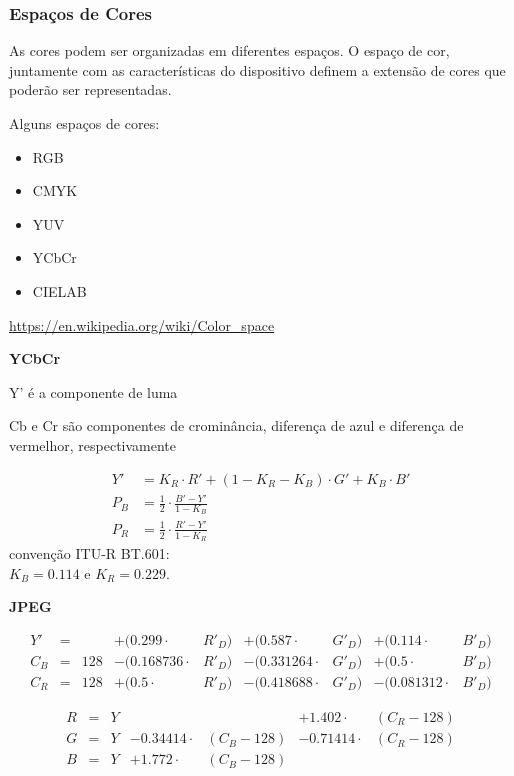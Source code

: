 \begin{frame}[allowframebreaks]
  \frametitle{Espaços de Cores}
  As cores podem ser organizadas em diferentes espaços. O espaço de cor, juntamente com as 
  características do dispositivo definem a extensão de cores que poderão ser representadas.

  Alguns espaços de cores:
  \begin{itemize}
  \item RGB 
  \item CMYK
  \item YUV
  \item YCbCr
  \item CIELAB
  \end{itemize}

  \url{https://en.wikipedia.org/wiki/Color_space}

  \framebreak
  \textbf{YCbCr}

  Y' é a componente de luma
  
  Cb e Cr são componentes de crominância, diferença de azul e diferença de vermelhor, respectivamente
  
  \begin{equation}
  \begin{aligned}
   Y' &= K_R \cdot R' + (1 - K_R - K_B) \cdot G' + K_B \cdot B'\\
   P_B &= \frac12 \cdot \frac{B' - Y'}{1 - K_B}\\
   P_R &= \frac12 \cdot \frac{R' - Y'}{1 - K_R}
  \end{aligned} \nonumber
  \end{equation}
  convenção ITU-R BT.601: \\
  $K_B = 0.114$ e $K_R = 0.229$.


  \framebreak
  \textbf{JPEG}

  \begin{equation}
  \begin{aligned}
   Y'  &=&     &+ (0.299    \cdot& R'_D) &+ (0.587    \cdot& G'_D) &+ (0.114    \cdot& B'_D) \\
   C_B &=& 128 &- (0.168736 \cdot& R'_D) &- (0.331264 \cdot& G'_D) &+ (0.5      \cdot& B'_D) \\
   C_R &=& 128 &+ (0.5      \cdot& R'_D) &- (0.418688 \cdot& G'_D) &- (0.081312 \cdot& B'_D) 
  \end{aligned} \nonumber
  \end{equation}
  
  \begin{equation}
  \begin{aligned}
  R  &=& Y                            &&& + 1.402   \cdot &(C_R-128) \\
  G  &=& Y   &- 0.34414 \cdot &(C_B-128)& - 0.71414 \cdot &(C_R-128) \\
  B  &=& Y   &+ 1.772   \cdot &(C_B-128)&
  \end{aligned} \nonumber
  \end{equation}

\end{frame}

